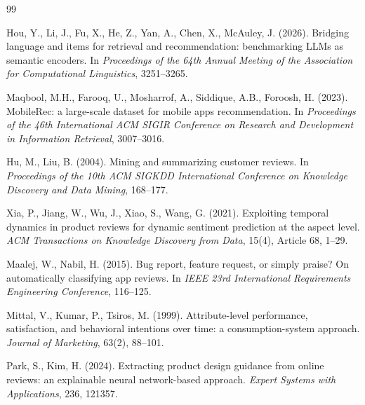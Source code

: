 \documentclass[11pt,a4paper]{article}
\begin{document}
\begin{thebibliography}{99}



Hou, Y., Li, J., Fu, X., He, Z., Yan, A., Chen, X., McAuley, J. (2026).
Bridging language and items for retrieval and recommendation: benchmarking
LLMs as semantic encoders. In \textit{Proceedings of the 64th Annual Meeting
of the Association for Computational Linguistics}, 3251--3265.

Maqbool, M.H., Farooq, U., Mosharrof, A., Siddique, A.B., Foroosh, H. (2023).
MobileRec: a large-scale dataset for mobile apps recommendation. In
\textit{Proceedings of the 46th International ACM SIGIR Conference on Research
and Development in Information Retrieval}, 3007--3016.


Hu, M., Liu, B. (2004).
Mining and summarizing customer reviews. In \textit{Proceedings of the 10th
ACM SIGKDD International Conference on Knowledge Discovery and Data Mining},
168--177.

Xia, P., Jiang, W., Wu, J., Xiao, S., Wang, G. (2021).
Exploiting temporal dynamics in product reviews for dynamic sentiment
prediction at the aspect level.
\textit{ACM Transactions on Knowledge Discovery from Data}, 15(4),
Article 68, 1--29.

Maalej, W., Nabil, H. (2015).
Bug report, feature request, or simply praise? On automatically classifying app
reviews. In \textit{IEEE 23rd International Requirements Engineering
Conference}, 116--125.

Mittal, V., Kumar, P., Tsiros, M. (1999).
Attribute-level performance, satisfaction, and behavioral intentions over time:
a consumption-system approach.
\textit{Journal of Marketing}, 63(2), 88--101.

Park, S., Kim, H. (2024).
Extracting product design guidance from online reviews: an explainable neural
network-based approach.
\textit{Expert Systems with Applications}, 236, 121357.


\end{thebibliography}
\end{document}
